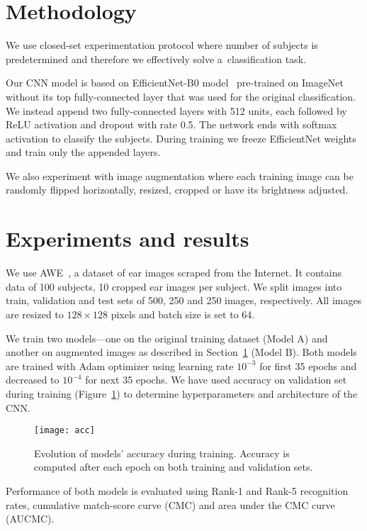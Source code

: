 \documentclass[9pt]{IEEEtran}
\begin{document}
\section{Methodology}\label{sec:meth}

We use closed-set experimentation protocol where number of subjects is predetermined and therefore we effectively solve a~classification task.

Our CNN model is based on EfficientNet-B0 model~\cite{efficientNet} pre-trained on ImageNet~\cite{imageNet} without its top fully-connected layer that was used for the original classification.
We instead append two fully-connected layers with 512 units, each followed by ReLU activation and dropout with rate 0.5.
The network ends with softmax activation to classify the subjects.
During training we freeze EfficientNet weights and train only the appended layers.

We also experiment with image augmentation where each training image can be randomly flipped horizontally, resized, cropped or have its brightness adjusted.

\section{Experiments and results}

We use AWE~\cite{emersic2017ear}, a dataset of ear images scraped from the Internet.
It contains data of 100 subjects, 10 cropped ear images per subject.
We split images into train, validation and test sets of 500, 250 and 250 images, respectively.
All images are resized to $128 \times 128$ pixels and batch size is set to 64.

We train two models---one on the original training dataset (Model A) and another on augmented images as described in Section~\ref{sec:meth} (Model B).
Both models are trained with Adam optimizer using learning rate $10^{-3}$ for first 35 epochs and decreased to $10^{-4}$ for next 35 epochs.
We have used accuracy on validation set during training (Figure~\ref{fig:acc}) to determine hyperparameters and architecture of the CNN.

\begin{figure}[ht]
    \centering
    \texttt{[image: acc]}
    \caption{Evolution of models' accuracy during training.
    Accuracy is computed after each epoch on both training and validation sets.}
    \label{fig:acc}
\end{figure}

Performance of both models is evaluated using Rank-1 and Rank-5 recognition rates, cumulative match-score curve (CMC) and area under the CMC curve (AUCMC).
\end{document}
